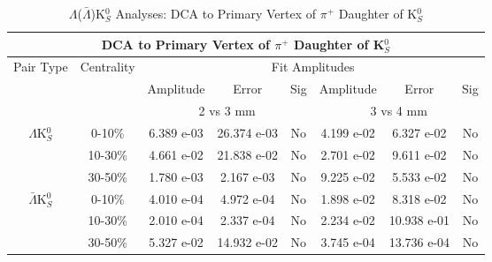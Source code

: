 \documentclass[../AnalysisNoteJBuxton.tex]{subfiles}
\begin{document}
\begin{table}
 \centering
 \begin{tabular}{|c|c|c|c|c||c|c|c|}
  \multicolumn{8}{c}{DCA to Primary Vertex of $\pi^{+}$ Daughter of K$^{0}_{S}$} \\
  \hline
  \multirow{3}{*}{Pair Type} & \multirow{3}{*}{Centrality} & \multicolumn{6}{c|}{Fit Amplitudes} \\
  \cline{3-8}
   & & Amplitude & Error & Sig & Amplitude & Error & Sig \\  
  \cline{3-8}
   & & \multicolumn{3}{c||}{2 vs 3 mm} & \multicolumn{3}{c|}{3 vs 4 mm} \\  
  \hline  
  \multirow{3}{*}{$\Lambda$K$^{0}_{S}$}  
   &  0-10\% & 6.389 e-03 & 26.374 e-03 & No & 4.199 e-02 & 6.327 e-02 & No \\
   & 10-30\% & 4.661 e-02 & 21.838 e-02 & No & 2.701 e-02 & 9.611 e-02 & No \\
   & 30-50\% & 1.780 e-03 & 2.167 e-03 & No & 9.225 e-02 & 5.533 e-02 & No \\
  \hline  
  \multirow{3}{*}{$\bar{\Lambda}$K$^{0}_{S}$}  
   &  0-10\% & 4.010 e-04 & 4.972 e-04 & No & 1.898 e-02 & 8.318 e-02 & No \\
   & 10-30\% & 2.010 e-04 & 2.337 e-04 & No & 2.234 e-02 & 10.938 e-01 & No \\
   & 30-50\% & 5.327 e-02 & 14.932 e-02 & No & 3.745 e-04 & 13.736 e-04 & No \\
  \hline
 \end{tabular}
 \caption{$\Lambda$($\bar{\Lambda}$)K$^{0}_{S}$ Analyses: DCA to Primary Vertex of $\pi^{+}$ Daughter of K$^{0}_{S}$}
 \label{tab:DcaToPrimVertexPosPionDaughtOfK0LamK0}
\end{table}
\end{document}
